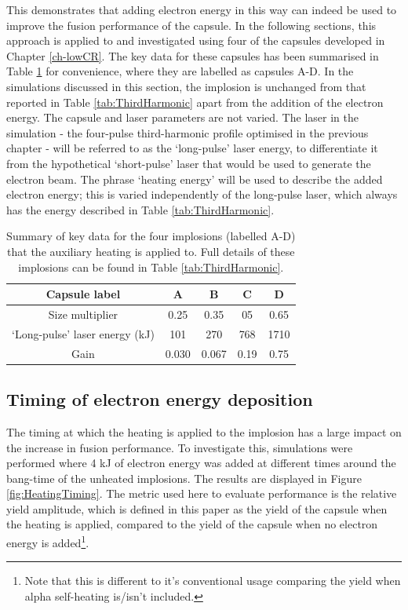 This demonstrates that adding electron energy in this way can indeed be used to improve the fusion performance of the capsule. In the following sections, this approach is applied to and investigated using four of the capsules developed in Chapter \ref{ch-lowCR}. The key data for these capsules has been summarised in Table \ref{tab:Heating capsules} for convenience, where they are labelled as capsules A-D. In the simulations discussed in this section, the implosion is unchanged from that reported in Table \ref{tab:ThirdHarmonic} apart from the addition of the electron energy. The capsule and laser parameters are not varied. The laser in the simulation - the four-pulse third-harmonic profile optimised in the previous chapter - will be referred to as the `long-pulse' laser energy, to differentiate it from the hypothetical `short-pulse' laser that would be used to generate the electron beam. The phrase `heating energy' will be used to describe the added electron energy; this is varied independently of the long-pulse laser, which always has the energy described in Table \ref{tab:ThirdHarmonic}.

\begin{table}
\centering
\begin{tabular}{|c|c|c|c|c|}
\hline
Capsule label &  A & B & C & D \\ 
\hline
Size multiplier & 0.25 & 0.35 & 05 & 0.65 \\
`Long-pulse' laser energy (kJ) & 101  & 270 & 768 & 1710 \\ 
Gain & 0.030 & 0.067 & 0.19 & 0.75\\ 
\hline
  \end{tabular}
  \caption{Summary of key data for the four implosions (labelled A-D) that the auxiliary heating is applied to. Full details of these implosions can be found in Table \ref{tab:ThirdHarmonic}.}
  \label{tab:Heating capsules}
\end{table}

\subsection{Timing of electron energy deposition}

The timing at which the heating is applied to the implosion has a large impact on the increase in fusion performance. To investigate this, simulations were performed where 4 kJ of electron energy was added at different times around the bang-time of the unheated implosions. The results are displayed in Figure \ref{fig:HeatingTiming}. The metric used here to evaluate performance is the relative yield amplitude, which is defined in this paper as the yield of the capsule when the heating is applied, compared to the yield of the capsule when no electron energy is added\footnote{Note that this is different to it's conventional usage comparing the yield when alpha self-heating is/isn't included.}.

